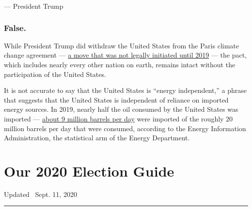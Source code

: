 --- President Trump

\hypertarget{false}{%
\subsubsection{False.}\label{false}}

While President Trump did withdraw the United States from the Paris
climate change agreement ---
\href{https://www.nytimes3xbfgragh.onion/2019/10/23/climate/trump-paris-climate-accord.html}{a
move that was not legally initiated until 2019} --- the pact, which
includes nearly every other nation on earth, remains intact without the
participation of the United States.

It is not accurate to say that the United States is ``energy
independent,'' a phrase that suggests that the United States is
independent of reliance on imported energy sources. In 2019, nearly half
the oil consumed by the United States was imported ---
\href{https://www.eia.gov/tools/faqs/faq.php?id=727\&t=6\#:~:text=In\%202019\%2C\%20the\%20United\%20States,(including\%20ethanol\%20and\%20biodiesel).}{about
9 million barrels per day} were imported of the roughly 20 million
barrels per day that were consumed, according to the Energy Information
Administration, the statistical arm of the Energy Department.

\hypertarget{our-2020-election-guide}{%
\section{Our 2020 Election Guide}\label{our-2020-election-guide}}

Updated ~Sept. 11, 2020

\begin{center}\rule{0.5\linewidth}{\linethickness}\end{center}

